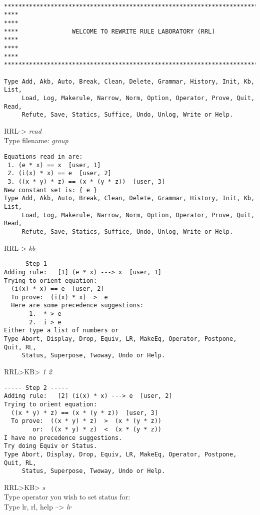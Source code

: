 \small 
\tt 
\begin{verbatim}
****************************************************************************
****                                                                    ****
****               WELCOME TO REWRITE RULE LABORATORY (RRL)             ****
****                                                                    ****
****************************************************************************

Type Add, Akb, Auto, Break, Clean, Delete, Grammar, History, Init, Kb, List,
     Load, Log, Makerule, Narrow, Norm, Option, Operator, Prove, Quit, Read,
     Refute, Save, Statics, Suffice, Undo, Unlog, Write or Help.
\end{verbatim}
RRL-> {\em read}\\
Type filename: {\em group}
\begin{verbatim}
Equations read in are:
 1. (e * x) == x  [user, 1]
 2. (i(x) * x) == e  [user, 2]
 3. ((x * y) * z) == (x * (y * z))  [user, 3]
New constant set is: { e }
Type Add, Akb, Auto, Break, Clean, Delete, Grammar, History, Init, Kb, List,
     Load, Log, Makerule, Narrow, Norm, Option, Operator, Prove, Quit, Read,
     Refute, Save, Statics, Suffice, Undo, Unlog, Write or Help.
\end{verbatim}
RRL-> {\em kb}
\begin{verbatim}
----- Step 1 -----
Adding rule:   [1] (e * x) ---> x  [user, 1]
Trying to orient equation: 
  (i(x) * x) == e  [user, 2]
  To prove:  (i(x) * x)  >  e
  Here are some precedence suggestions:
       1.  * > e
       2.  i > e
Either type a list of numbers or
Type Abort, Display, Drop, Equiv, LR, MakeEq, Operator, Postpone, Quit, RL,
     Status, Superpose, Twoway, Undo or Help.
\end{verbatim}
RRL>KB> {\em 1 2}
\begin{verbatim}
----- Step 2 -----
Adding rule:   [2] (i(x) * x) ---> e  [user, 2]
Trying to orient equation: 
  ((x * y) * z) == (x * (y * z))  [user, 3]
  To prove:  ((x * y) * z)  >  (x * (y * z))
        or:  ((x * y) * z)  <  (x * (y * z))
I have no precedence suggestions.  
Try doing Equiv or Status.
Type Abort, Display, Drop, Equiv, LR, MakeEq, Operator, Postpone, Quit, RL,
     Status, Superpose, Twoway, Undo or Help.
\end{verbatim}
RRL>KB> {\em s}\\
Type operator you wish to set status for: {\em *}\\
Type lr, rl, help --> {\em lr}
